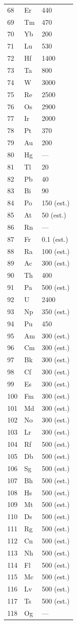 \documentclass[12pt,a4paper]{article}
\begin{document}
\begin{longtable}{p{0.6cm}p{1.2cm}p{2.5cm}}
		68 & Er & 440 \\
		69 & Tm & 470 \\
		70 & Yb & 200 \\
		71 & Lu & 530 \\
		72 & Hf & 1400 \\
		73 & Ta & 800 \\
		74 & W  & 3000 \\
		75 & Re & 2500 \\
		76 & Os & 2900 \\
		77 & Ir & 2000 \\
		78 & Pt & 370 \\
		79 & Au & 200 \\
		80 & Hg & — \\
		81 & Tl & 20 \\
		82 & Pb & 40 \\
		83 & Bi & 90 \\
		84 & Po & 150 (est.) \\
		85 & At & 50 (est.) \\
		86 & Rn & — \\
		87 & Fr & 0.1 (est.) \\
		88 & Ra & 100 (est.) \\
		89 & Ac & 300 (est.) \\
		90 & Th & 400 \\
		91 & Pa & 500 (est.) \\
		92 & U  & 2400 \\
		93 & Np & 350 (est.) \\
		94 & Pu & 450 \\
		95 & Am & 300 (est.) \\
		96 & Cm & 300 (est.) \\
		97 & Bk & 300 (est.) \\
		98 & Cf & 300 (est.) \\
		99 & Es & 300 (est.) \\
		100& Fm & 300 (est.) \\
		101& Md & 300 (est.) \\
		102& No & 300 (est.) \\
		103& Lr & 300 (est.) \\
		104& Rf & 500 (est.) \\
		105& Db & 500 (est.) \\
		106& Sg & 500 (est.) \\
		107& Bh & 500 (est.) \\
		108& Hs & 500 (est.) \\
		109& Mt & 500 (est.) \\
		110& Ds & 500 (est.) \\
		111& Rg & 500 (est.) \\
		112& Cn & 500 (est.) \\
		113& Nh & 500 (est.) \\
		114& Fl & 500 (est.) \\
		115& Mc & 500 (est.) \\
		116& Lv & 500 (est.) \\
		117& Ts & 500 (est.) \\
		118& Og & — \\
		\bottomrule
	\end{longtable}
\end{document}
